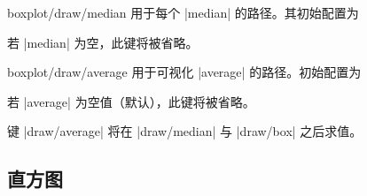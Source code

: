 \begin{pgfplotscodekey}{boxplot/draw/median}
    用于每个 |median| 的路径。其初始配置为
\begin{codeexample}
\end{codeexample}
    若 |median| 为空，此键将被省略。
\end{pgfplotscodekey}

\begin{pgfplotscodekey}{boxplot/draw/average}
    用于可视化 |average| 的路径。初始配置为
\begin{codeexample}
\makeatletter
{}
\makeatother
\end{codeexample}
    若 |average| 为空值（默认），此键将被省略。

    键 |draw/average| 将在 |draw/median| 与 |draw/box| 之后求值。
\end{pgfplotscodekey}

\endgroup


\subsection{直方图}
\label{sec:histograms}

